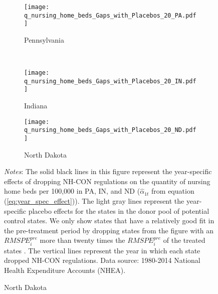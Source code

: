 \documentclass[../Main.tex]{subfiles}
\begin{document}
\newpage
\begin{figure}[t]
	\begin{center}
	\caption{\label{fig:q_nursing_home_beds_gaps} \centering Year-Specific Effects of Dropping NH-CON on the Quantity of Nursing Home Beds Per 100,000 ($\hat{\alpha}_{1t}$)}
    \begin{subfigure}[b]{\textwidth} \centering
    \caption{Pennsylvania}\texttt{[image: q\_nursing\_home\_beds\_Gaps\_with\_Placebos\_20\_PA.pdf]}
    \end{subfigure}\\
    \vspace{.4cm}
    \begin{subfigure}[b]{.48\textwidth} \centering
    \caption{Indiana}\texttt{[image: q\_nursing\_home\_beds\_Gaps\_with\_Placebos\_20\_IN.pdf]}
    \end{subfigure}\quad%
    \begin{subfigure}[b]{.48\textwidth} \centering
    \caption{North Dakota}\texttt{[image: q\_nursing\_home\_beds\_Gaps\_with\_Placebos\_20\_ND.pdf]}
    \end{subfigure}
    \end{center}
    \footnotesize
		\textit{Notes}: The solid black lines in this figure represent the year-specific effects of dropping NH-CON regulations on the quantity of nursing home beds per 100,000 in PA, IN, and ND ($\hat{\alpha}_{1t}$ from equation (\ref{eq:year_spec_effect})). The light gray lines represent the year-specific placebo effects for the states in the donor pool of potential control states. We only show states that have a relatively good fit in the pre-treatment period by dropping states from the figure with an $RMSPE_i^{pre}$ more than twenty times the $RMSPE_i^{pre}$ of the treated states \citep{abadie2010synthetic}. The vertical lines represent the year in which each state dropped NH-CON regulations. Data source: 1980-2014 National Health Expenditure Accounts (NHEA).
\end{figure}
\clearpage
\end{document}
